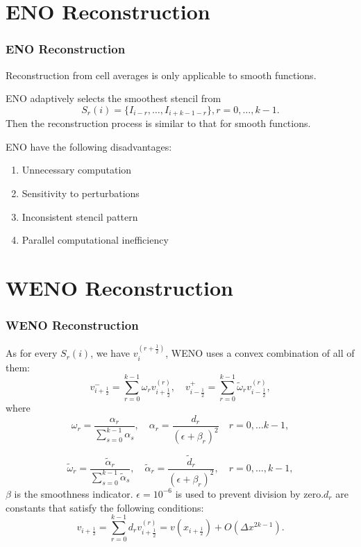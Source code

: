 \documentclass{beamer}
\begin{document}
\section{ENO Reconstruction}
\begin{frame}[allowframebreaks]
    \frametitle{ENO Reconstruction}
    Reconstruction from cell averages is only applicable to smooth functions.

    ENO adaptively selects the smoothest stencil from
    \[
        S_{r}(i) = \{I_{i-r}, \dots,I_{i+k-1-r}\}, r = 0, \dots,k-1.
    \]
    Then the reconstruction process is similar to that for smooth functions.

    \vspace{0.5cm}

    ENO have the following disadvantages:
    \begin{enumerate}
        \item Unnecessary computation
        \item Sensitivity to perturbations
        \item  Inconsistent stencil pattern
        \item  Parallel computational inefficiency
    \end{enumerate}
\end{frame}

\section{WENO Reconstruction}
\begin{frame}[allowframebreaks]
    \frametitle{WENO Reconstruction}
    As for every \(S_r(i)\), we have \(v_i^{(r+\frac{1}{2})}\), WENO uses a convex combination of all of them:
    \[
        v_{i+\frac{1}{2}}^{-}=\sum_{r=0}^{k-1} \omega_r v_{i+\frac{1}{2}}^{(r)}, \quad v_{i-\frac{1}{2}}^{+}=\sum_{r=0}^{k-1} \tilde{\omega}_r v_{i-\frac{1}{2}}^{(r)},
    \]
    where
    \[
        \omega_{r}=\frac{\alpha_{r}}{\sum_{s=0}^{k-1}\alpha_{s}},\quad
        \alpha_{r} = \frac{d_{r}}{(\epsilon+\beta_{r})^2}\quad r = 0,\dots k-1,
    \]

    \[
        \tilde{\omega}_r=\frac{\tilde{\alpha}_r}{\sum_{s=0}^{k-1} \tilde{\alpha}_s}, \quad \tilde{\alpha}_r=\frac{\tilde{d}_r}{\left(\epsilon+\beta_r\right)^2}, \quad r=0, \ldots, k-1,
    \]
    \(\beta\) is the smoothness indicator. \(\epsilon=10^{-6}\) is used to prevent division by zero.\(d_r\) are constants that satisfy the following conditions:
    \[
        v_{i+\frac12}=\sum_{r=0}^{k-1}d_rv_{i+\frac12}^{(r)}=v(x_{i+\frac12})+O(\Delta x^{2k-1}) .
    \]
\end{frame}
\end{document}
